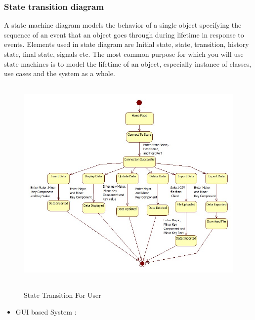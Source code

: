 \subsubsection{State transition diagram}
\hspace*{0.7in} A state machine diagram models the behavior of a single object specifying the sequence of an event that an object goes through during lifetime in response to events. Elements used in state diagram are Initial state, state, transition, history state, final state, signals etc. The most common purpose for which you will use state machines is to model the lifetime of an object, especially instance of classes, use cases and the system as a whole.
\\
\begin{figure}[h]
\centering
  \includegraphics[width=13cm,height=10.5cm]{Fig11.jpg}\\
  \caption{State Transition For User}
  \label{State Transition For User}
\end{figure}

\newpage
\begin{itemize}
  \item GUI based  System :
\end{itemize}

